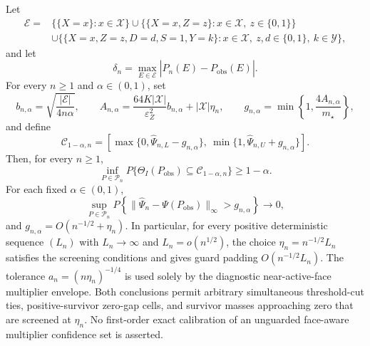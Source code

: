 Let
\[
\begin{aligned}
\mathcal E={}&\bigl\{\{X=x\}:x\in\mathcal X\bigr\}
\cup\bigl\{\{X=x,Z=z\}:x\in\mathcal X,\ z\in\{0,1\}\bigr\}\\
&\cup\bigl\{\{X=x,Z=z,D=d,S=1,Y=k\}:x\in\mathcal X,\ z,d\in\{0,1\},\ k\in\mathcal Y\bigr\},
\end{aligned}
\]
and let
\[
\delta_n=\max_{E\in\mathcal E}\left|\widehat P_n(E)-P_{\mathrm{obs}}(E)\right|.
\]
For every \(n\ge1\) and \(\alpha\in(0,1)\), set
\[
b_{n,\alpha}=\sqrt{\frac{|\mathcal E|}{4n\alpha}},\qquad
A_{n,\alpha}=\frac{64K|\mathcal X|}{\varepsilon_Z^2}b_{n,\alpha}+|\mathcal X|\eta_n,
\qquad
g_{n,\alpha}=\min\left\{1,\frac{4A_{n,\alpha}}{m_{\star}}\right\},
\]
and define
\[
\mathcal C_{1-\alpha,n}
=\left[\max\{0,\widehat\Psi_{n,L}-g_{n,\alpha}\},\
\min\{1,\widehat\Psi_{n,U}+g_{n,\alpha}\}\right].
\]
Then, for every \(n\ge1\),
\[
\inf_{P\in\mathcal P_n}P\{\Theta_I(P_{\mathrm{obs}})\subseteq\mathcal C_{1-\alpha,n}\}\ge1-\alpha.
\]
For each fixed \(\alpha\in(0,1)\),
\[
\sup_{P\in\mathcal P_n}
P\!\left\{\|\widehat\Psi_n-\Psi(P_{\mathrm{obs}})\|_\infty>g_{n,\alpha}\right\}\longrightarrow0,
\]
and \(g_{n,\alpha}=O(n^{-1/2}+\eta_n)\).  In particular, for every positive deterministic sequence \((L_n)\) with \(L_n\to\infty\) and \(L_n=o(n^{1/2})\), the choice \(\eta_n=n^{-1/2}L_n\) satisfies the screening conditions and gives guard padding \(O(n^{-1/2}L_n)\).  The tolerance \(a_n=(n\eta_n)^{-1/4}\) is used solely by the diagnostic near-active-face multiplier envelope.  Both conclusions permit arbitrary simultaneous threshold-cut ties, positive-survivor zero-gap cells, and survivor masses approaching zero that are screened at \(\eta_n\).  No first-order exact calibration of an unguarded face-aware multiplier confidence set is asserted.